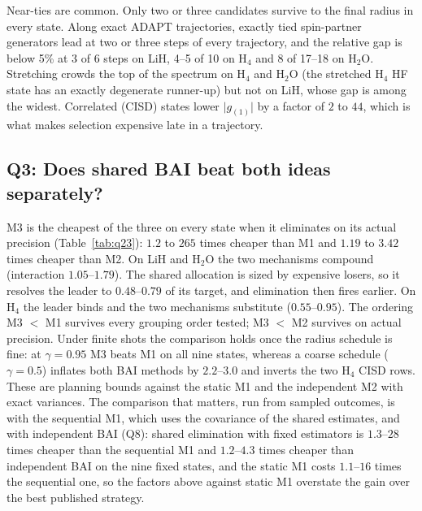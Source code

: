 \documentclass[aps,pra,reprint,superscriptaddress,nofootinbib]{revtex4-2}
\begin{document}
Near-ties are common. Only two or three candidates survive to the final radius in every state. Along exact ADAPT trajectories, exactly tied spin-partner generators lead at two or three steps of every trajectory, and the relative gap is below 5\% at 3 of 6 steps on LiH, 4--5 of 10 on H$_4$ and 8 of 17--18 on H$_2$O. Stretching crowds the top of the spectrum on H$_4$ and H$_2$O (the stretched H$_4$ HF state has an exactly degenerate runner-up) but not on LiH, whose gap is among the widest. Correlated (CISD) states lower $\lvert g_{(1)}\rvert$ by a factor of $2$ to $44$, which is what makes selection expensive late in a trajectory.

\subsection{Q3: Does shared BAI beat both ideas separately?}

M3 is the cheapest of the three on every state when it eliminates on its actual precision (Table~\ref{tab:q23}): $1.2$ to $265$ times cheaper than M1 and $1.19$ to $3.42$ times cheaper than M2. On LiH and H$_2$O the two mechanisms compound (interaction $1.05$--$1.79$). The shared allocation is sized by expensive losers, so it resolves the leader to $0.48$--$0.79$ of its target, and elimination then fires earlier. On H$_4$ the leader binds and the two mechanisms substitute ($0.55$--$0.95$). The ordering M3 $<$ M1 survives every grouping order tested; M3 $<$ M2 survives on actual precision. Under finite shots the comparison holds once the radius schedule is fine: at $\gamma=0.95$ M3 beats M1 on all nine states, whereas a coarse schedule ($\gamma=0.5$) inflates both BAI methods by $2.2$--$3.0$ and inverts the two H$_4$ CISD rows. These are planning bounds against the static M1 and the independent M2 with exact variances. The comparison that matters, run from sampled outcomes, is with the sequential M1, which uses the covariance of the shared estimates, and with independent BAI (Q8): shared elimination with fixed estimators is $1.3$--$28$ times cheaper than the sequential M1 and $1.2$--$4.3$ times cheaper than independent BAI on the nine fixed states, and the static M1 costs $1.1$--$16$ times the sequential one, so the factors above against static M1 overstate the gain over the best published strategy.
\end{document}
